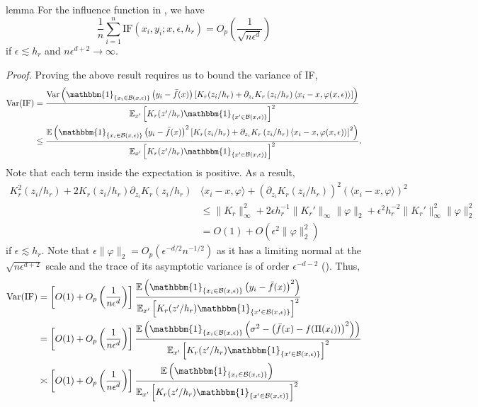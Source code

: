 \documentclass[11pt]{article}
\begin{document}
\begin{restatable}{lemma}{}\label{lemma: if bound}
    For the influence function in , we have
    \begin{equation}
        \frac{1}{n}\sum_{i = 1}^n \text{IF}(x_i, y_i; x, \epsilon, h_r) = O_p\left(\frac{1}{\sqrt{n\epsilon^{d}}}\right)
    \end{equation}
    if $\epsilon \lesssim h_r$ and $n\epsilon^{d+2} \rightarrow \infty$.
\end{restatable}
\noindent \textit{Proof.} Proving the above result requires us to bound the variance of IF,
\begin{align*}
    \text{Var}(\text{IF}) &= \frac{\text{Var}\left(\mathbbm{1}_{\{x_i \in \mathcal{B}(x, \epsilon)\}}\left(y_i - \bar{f}(x)\right)\left[K_r(z_i/h_r) + \partial_{z_i}K_r\left(z_i/h_r\right)\left\langle x_i - x, \varphi(x,\epsilon)\right\rangle\right]\right)}{\mathbb{E}_{x'}\left[K_r(z'/h_r)\mathbbm{1}_{\{x'\in \mathcal{B}(x, \epsilon)\}}\right]^2} \\
    &\leq \frac{\mathbb{E}\left(\mathbbm{1}_{\{x_i \in \mathcal{B}(x, \epsilon)\}}\left(y_i - \bar{f}(x)\right)^2\left[K_r(z_i/h_r) + \partial_{z_i}K_r\left(z_i/h_r\right)\left\langle x_i - x, \varphi(x,\epsilon)\right\rangle\right]^2\right)}{\mathbb{E}_{x'}\left[K_r(z'/h_r)\mathbbm{1}_{\{x'\in \mathcal{B}(x, \epsilon)\}}\right]^2}.
\end{align*}
Note that each term inside the expectation is positive. As a result,
\begin{align}
    K_r^2(z_i/h_r) + 2K_r(z_i/h_r)\partial_{z_i}K_r(z_i/h_r)&\langle x_i - x, \varphi\rangle + (\partial_{z_i}K_r(z_i/h_r))^2(\langle x_i - x, \varphi\rangle)^2 \\&\leq \|K_r\|_{\infty}^2 + 2\epsilon h_r^{-1}\|K_r'\|_{\infty}\|\varphi\|_2 + \epsilon^2h_r^{-2}\|K_r'\|_{\infty}^2\|\varphi\|_2^2 \\
    &= O(1) + O(\epsilon^2\|\varphi\|_2^2)
\end{align}
if $\epsilon \lesssim h_r$. Note that $\epsilon\|\varphi\|_2 = O_p(\epsilon^{-d/2 }n^{-1/2})$ as it has a limiting normal at the $\sqrt{n\epsilon^{d+2}}$ scale and the trace of its asymptotic variance is of order $\epsilon^{-d-2}$ (). Thus,
\begin{align*}
    \text{Var}(\text{IF}) &= \left[O(1) + O_p\left(\frac{1}{n\epsilon^{d}}\right)\right]\frac{\mathbb{E}\left(\mathbbm{1}_{\{x_i \in \mathcal{B}(x, \epsilon)\}}\left(y_i - \bar{f}(x)\right)^2\right)}{\mathbb{E}_{x'}\left[K_r(z'/h_r)\mathbbm{1}_{\{x'\in \mathcal{B}(x, \epsilon)\}}\right]^2} \\
    &= \left[O(1) + O_p\left(\frac{1}{n\epsilon^{d}}\right)\right]\frac{\mathbb{E}\left(\mathbbm{1}_{\{x_i \in \mathcal{B}(x, \epsilon)\}}\left(\sigma^2 - \left(\bar{f}(x) - f(\Pi(x_i))\right)^2\right)\right)}{\mathbb{E}_{x'}\left[K_r(z'/h_r)\mathbbm{1}_{\{x'\in \mathcal{B}(x, \epsilon)\}}\right]^2} \\
    &\asymp \left[O(1) + O_p\left(\frac{1}{n\epsilon^{d}}\right)\right]\frac{\mathbb{E}\left(\mathbbm{1}_{\{x_i \in \mathcal{B}(x, \epsilon)\}}\right)}{\mathbb{E}_{x'}\left[K_r(z'/h_r)\mathbbm{1}_{\{x'\in \mathcal{B}(x, \epsilon)\}}\right]^2}
\end{align*}
\end{document}
